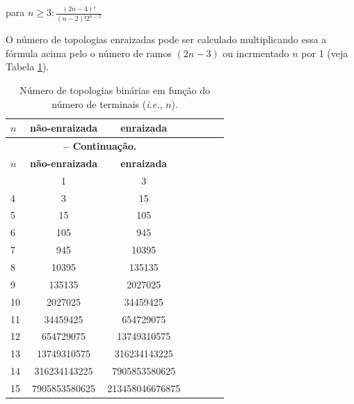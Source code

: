 \begin{refsection}
\begin{center}
	para $n\geq3\colon\frac{(2n-4)!}{(n-2)!2^{n-2}}$
\end{center}
	
	O número de topologias enraizadas pode ser calculado multiplicando essa a fórmula acima pelo o número de ramos $(2n-3)$ ou incrmentado $n$ por 1 (veja Tabela \ref{tut3:table:enumeration}).



\pagestyle{fancy}
\begin{center}

\begin{longtable}{lcccccc}
\caption[Tabela \ref{tut3:table:enumeration}: Enumeração de topologias]{Número de topologias binárias em função do número de terminais (\textit{i.e.}, $n$).} \label{tut3:table:enumeration} \\


\hline\hline  \textbf{$n$} & \textbf{não-enraizada} & \textbf{enraizada}\\
\hline
\endfirsthead

\multicolumn{3}{c}{{\bfseries \tablename\ \thetable{} -- Continuação.}}\\
\hline\hline \textbf{$n$} & \textbf{não-enraizada} & \textbf{enraizada}\\

\endhead
\hline \hline
\endlastfoot
3 & 1 & 3\\
4 & 3 & 15\\
5 & 15 & 105\\
6 & 105 & 945\\
7 & 945 & 10395\\
8 & 10395 & 135135\\
9 & 135135 & 2027025\\
10 & 2027025 & 34459425\\
11 & 34459425 & 654729075\\
12 & 654729075 & 13749310575\\
13 & 13749310575 & 316234143225\\
14 & 316234143225 & 7905853580625\\
15 & 7905853580625 & 213458046676875\\


\end{longtable}
\end{center}
\end{refsection}
